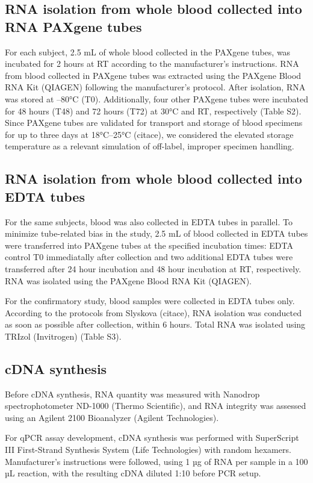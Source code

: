 \subsection*{RNA isolation from whole blood collected into RNA PAXgene tubes}
For each subject, 2.5 mL of whole blood collected in the PAXgene tubes, was incubated for 2 hours at RT according to the manufacturer's instructions. RNA from blood collected in PAXgene tubes was extracted using the PAXgene Blood RNA Kit (QIAGEN) following the manufacturer's protocol. After isolation, RNA was stored at –80°C (T0). Additionally, four other PAXgene tubes were incubated for 48 hours (T48) and 72 hours (T72) at 30°C and RT, respectively (Table S2). Since PAXgene tubes are validated for transport and storage of blood specimens for up to three days at 18°C–25°C (citace), we considered the elevated storage temperature as a relevant simulation of off-label, improper specimen handling. 

\subsection*{RNA isolation from whole blood collected into EDTA tubes}
For the same subjects, blood was also collected in EDTA tubes in parallel. To minimize tube-related bias in the study, 2.5 mL of blood collected in EDTA tubes were transferred into PAXgene tubes at the specified incubation times: EDTA control T0 immediatally after collection and two additional EDTA tubes were transferred after 24 hour incubation and 48 hour incubation at RT, respectively. RNA was isolated using the PAXgene Blood RNA Kit (QIAGEN).

For the confirmatory study, blood samples were collected in EDTA tubes only. According to the protocols from Slyskova (citace), RNA isolation was conducted as soon as possible after collection, within 6 hours. Total RNA was isolated using TRIzol (Invitrogen) (Table S3).  

\subsection*{cDNA synthesis}
Before cDNA synthesis, RNA quantity was measured with Nanodrop spectrophotometer ND-1000 (Thermo Scientific), and RNA integrity was assessed using an Agilent 2100 Bioanalyzer (Agilent Technologies).

For qPCR assay development, cDNA synthesis was performed with SuperScript III First-Strand Synthesis System (Life Technologies) with random hexamers. Manufacturer’s  instructions were followed, using 1 µg of RNA per sample in a 100 µL reaction, with the resulting cDNA diluted 1:10 before PCR setup. 


